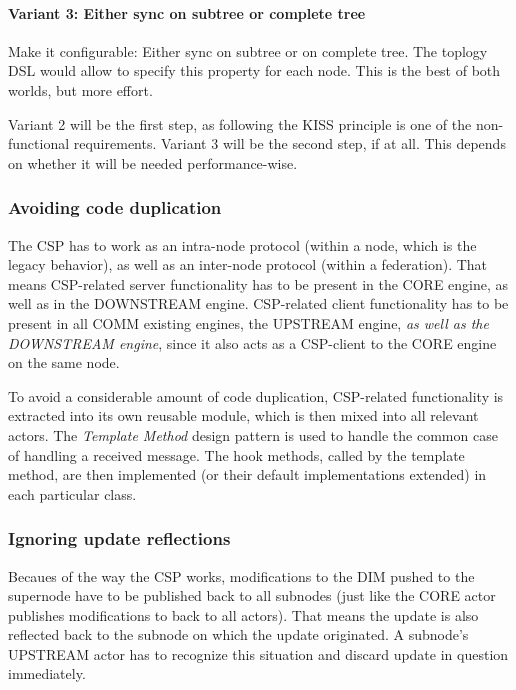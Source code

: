 \paragraph{Variant 3: Either sync on subtree or complete tree}
Make it configurable: Either sync on subtree or on complete tree. The
toplogy DSL would allow to specify this property for each node. This is
the best of both worlds, but more effort.

Variant 2 will be the first step, as following the \gls{KISS} principle is one
of the non-functional requirements. Variant 3 will be the second step, if at
all. This depends on whether it will be needed performance-wise.

\subsubsection{Avoiding code duplication}
The \gls{CSP} has to work as an intra-node protocol (within a node, which is
the legacy behavior), as well as an inter-node protocol (within a federation).
That means \gls{CSP}-related server functionality has to be present in the CORE
engine, as well as in the DOWNSTREAM engine. CSP-related client functionality has
to be present in all COMM existing engines, the UPSTREAM engine, \emph{as well
as the DOWNSTREAM engine}, since it also acts as a CSP-client to the CORE engine on
the same node.

To avoid a considerable amount of code duplication, CSP-related functionality
is extracted into its own reusable module, which is then mixed into all
relevant actors. The \emph{Template Method} design pattern is used to handle
the common case of handling a received
 message. The hook methods,
called by the template method, are then implemented (or their default
implementations extended) in each particular class.

\subsubsection{Ignoring update reflections}
Becaues of the way the \gls{CSP} works, modifications to the \gls{DIM} pushed
to the supernode have to be published back to all subnodes (just like the CORE
actor publishes modifications to back to all actors). That means the update is
also reflected back to the subnode on which the update originated. A subnode's
UPSTREAM actor has to recognize this situation and discard update in question
immediately.

